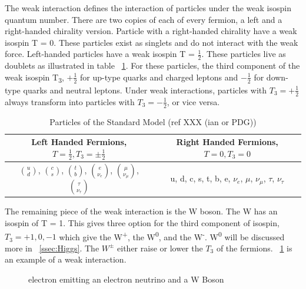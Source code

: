\indent The weak interaction defines the interaction of particles under the weak isospin quantum number. There are two copies of each of every fermion, a left and a right-handed chirality version. Particle with a right-handed chirality have a weak isospin T = 0. These particles exist as singlets and do not interact with the weak force. Left-handed particles have a weak isospin T =  ${\frac{1}{2}}$. These particles live as doublets as illustrated in table ~\ref{tab:chiral}. For these particles, the third component of the weak isospin T\textsubscript{3}, ${+\frac{1}{2}}$ for up-type quarks and charged leptons and ${-\frac{1}{2}}$ for down-type quarks and neutral leptons. Under weak interactions, particles with ${T_{3} = +\frac{1}{2}}$ always transform into particles with ${T_{3} = -\frac{1}{2}}$, or vice versa.\linebreak

\begin{table}[h]
\begin{center}
\def\arraystretch{1.5}
\begin{tabular}[h]{|c|c|}
\hline
Left Handed Fermions, ${T = \frac{1}{2}, T_{3} = \pm\frac{1}{2}}$ & Right Handed Fermions, ${T = 0, T_{3} = 0}$\\
\hline\hline
${\binom{u}{d}}$, ${\binom{c}{s}}$, ${\binom{t}{b}}$, ${\binom{e}{\nu_{e}}}$, ${\binom{\mu}{\nu_{\mu}}}$, ${\binom{\tau}{\nu_{\tau}}}$ & u, d, c, s, t, b, e, ${\nu_{e}}$, ${\mu}$, ${\nu_{\mu}}$, ${\tau}$, ${\nu_{\tau}}$ \\
\hline
\end{tabular}
\caption{Particles of the Standard Model (ref XXX (ian or PDG))}
\label{tab:chiral}
\end{center}
\end{table}


 \indent The remaining piece of the weak interaction is the W boson. The W has an isospin of T = 1. This gives three option for the third component of isospin, ${T_{3} = +1, 0, -1}$ which give the W\textsuperscript{+}, the W\textsuperscript{0}, and the W\textsuperscript{-}. W\textsuperscript{0} will be discussed more in ~\ref{ssec:Higgs}. The ${W^{\pm}}$ either raise or lower the ${T_{3}}$ of the fermions. ~\ref{Fig:weak_dia} is an example of a weak interaction.\linebreak

\begin{figure}[h]
\begin{center}

\caption{electron emitting an electron neutrino and a W Boson}
\label{Fig:weak_dia}
\end{center}
\end{figure}

